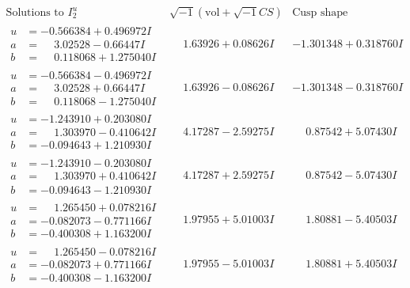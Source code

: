 \documentclass[1p]{elsarticle_modified}
\theoremstyle{definition}
\newcommand{\I}{\sqrt{-1}}
\begin{document}
$$\begin{array}{c|c|c}  
\text{Solutions to }I^u_{2}& \I (\text{vol} + \sqrt{-1}CS) & \text{Cusp shape}\\
 \hline 
\begin{aligned}
u &= -0.566384 + 0.496972 I \\
a &= \phantom{-}3.02528 - 0.66447 I \\
b &= \phantom{-}0.118068 + 1.275040 I\end{aligned}
 & \phantom{-}1.63926 + 0.08626 I & -1.301348 + 0.318760 I \\ \hline\begin{aligned}
u &= -0.566384 - 0.496972 I \\
a &= \phantom{-}3.02528 + 0.66447 I \\
b &= \phantom{-}0.118068 - 1.275040 I\end{aligned}
 & \phantom{-}1.63926 - 0.08626 I & -1.301348 - 0.318760 I \\ \hline\begin{aligned}
u &= -1.243910 + 0.203080 I \\
a &= \phantom{-}1.303970 - 0.410642 I \\
b &= -0.094643 + 1.210930 I\end{aligned}
 & \phantom{-}4.17287 - 2.59275 I & \phantom{-}0.87542 + 5.07430 I \\ \hline\begin{aligned}
u &= -1.243910 - 0.203080 I \\
a &= \phantom{-}1.303970 + 0.410642 I \\
b &= -0.094643 - 1.210930 I\end{aligned}
 & \phantom{-}4.17287 + 2.59275 I & \phantom{-}0.87542 - 5.07430 I \\ \hline\begin{aligned}
u &= \phantom{-}1.265450 + 0.078216 I \\
a &= -0.082073 - 0.771166 I \\
b &= -0.400308 + 1.163200 I\end{aligned}
 & \phantom{-}1.97955 + 5.01003 I & \phantom{-}1.80881 - 5.40503 I \\ \hline\begin{aligned}
u &= \phantom{-}1.265450 - 0.078216 I \\
a &= -0.082073 + 0.771166 I \\
b &= -0.400308 - 1.163200 I\end{aligned}
 & \phantom{-}1.97955 - 5.01003 I & \phantom{-}1.80881 + 5.40503 I \\ \hline\begin{aligned}

\end{aligned}
\end{array}$$
\end{document}
